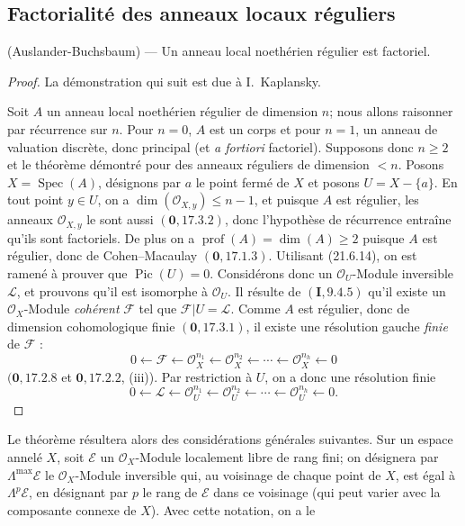 \subsection{Factorialité des anneaux locaux réguliers}
\label{IV.21.11}

\begin{theorem}[21.11.1]
\label{IV.21.11.1}
\textup{(Auslander-Buchsbaum)} ---
Un anneau local noethérien régulier est factoriel.
\end{theorem}

\begin{proof}
La démonstration qui suit est due à I.~Kaplansky.

Soit $A$ un anneau local noethérien régulier de dimension $n$; nous allons raisonner
par récurrence sur $n$. Pour $n=0$, $A$ est un corps et pour $n=1$, un anneau de
valuation discrète, donc principal (et \emph{a fortiori} factoriel). Supposons donc
$n\geq2$ et le théorème démontré pour des anneaux réguliers de dimension $<n$.
Posons $X=\operatorname{Spec}(A)$, désignons par $a$ le point fermé de $X$ et posons
$U=X-\{a\}$. En tout point $y\in U$, on a
$\dim(\mathcal O_{X,y})\leq n-1$, et puisque $A$ est régulier, les anneaux
$\mathcal O_{X,y}$ le sont aussi $(\mathbf 0, 17.3.2)$, donc l'hypothèse de
récurrence entraîne qu'ils sont factoriels. De plus on a
$\operatorname{prof}(A)=\dim(A)\geq2$ puisque $A$ est régulier, donc de
Cohen--Macaulay $(\mathbf 0, 17.1.3)$.
Utilisant (21.6.14), on est ramené à prouver que $\operatorname{Pic}(U)=0$.
Considérons donc un $\mathcal O_U$-Module inversible $\mathscr L$, et prouvons qu'il
est isomorphe à $\mathcal O_U$. Il résulte de $(\mathbf I, 9.4.5)$ qu'il existe un
$\mathcal O_X$-Module \emph{cohérent} $\mathscr F$ tel que
$\mathscr F|U=\mathscr L$. Comme $A$ est régulier, donc de dimension cohomologique
finie $(\mathbf 0, 17.3.1)$, il existe une résolution gauche \emph{finie} de
$\mathscr F$ :
\[
  0\leftarrow\mathscr F\leftarrow\mathcal O_X^{n_1}
  \leftarrow\mathcal O_X^{n_2}\leftarrow\cdots
  \leftarrow\mathcal O_X^{n_h}\leftarrow0
\]
$(\mathbf 0, 17.2.8$ et $\mathbf 0, 17.2.2$, (iii)). Par restriction à $U$, on a
donc une résolution finie
\[
\label{IV.21.11.1.1}
  0\leftarrow\mathscr L\leftarrow\mathcal O_U^{n_1}
  \leftarrow\mathcal O_U^{n_2}\leftarrow\cdots
  \leftarrow\mathcal O_U^{n_h}\leftarrow0.
  \tag{21.11.1.1}
\]
\end{proof}

Le théorème résultera alors des considérations générales suivantes. Sur un espace
annelé $X$, soit $\mathscr E$ un $\mathcal O_X$-Module localement libre de rang fini;
on désignera par $\Lambda^{\max}\mathscr E$ le $\mathcal O_X$-Module inversible qui,
au voisinage de chaque point de $X$, est égal à $\Lambda^p\mathscr E$, en désignant
par $p$ le rang de $\mathscr E$ dans ce voisinage (qui peut varier avec la composante
connexe de $X$). Avec cette notation, on a le


